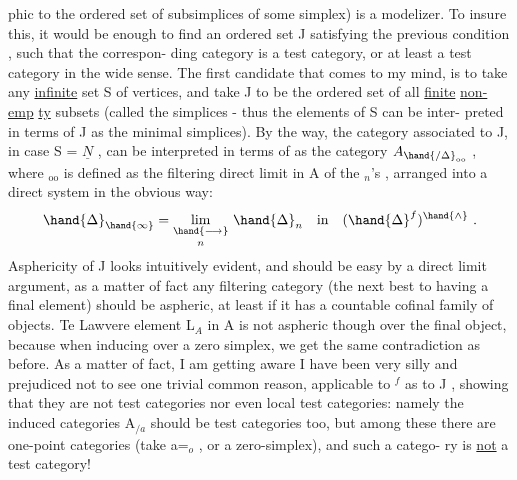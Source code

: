 
phic to the ordered set of subsimplices of some simplex) is a modelizer.
To insure this,  it would be enough to find an ordered set J satisfying the
previous condition  , such that the correspon-%
ding category is a test category,  or at least a test category in the wide
sense.  The first candidate that comes to my mind,  is to take any \uline{infinite}
set S of vertices,  and take J to be the ordered set of all \uline{finite} \uline{non-emp}%
\uline{ty} subsets (called the simplices  -  thus the elements of S can be inter-%
preted in terms of J as the minimal simplices).  By the way,  the category
associated to J,  in case S = $\underline{N}$ ,  can be interpreted in terms of  as
the category  $A_{\hand{/\Delta}_{\mathrm{oo}}}$ ,  where \hand{\ensuremath{\Delta}}$_{\mathrm{oo}}$ is defined as the filtering direct limit
 in A\hand{\ensuremath{^{\wedge}}} of the \hand{\ensuremath{\Delta}}$_n$'s ,  arranged into a direct system in the obvious way:
%
\[ \hand{\ensuremath{\Delta}}_{\hand{\infty}} = \underset{n}{\underset{\hand{\ensuremath{\longrightarrow}}}{\mathrm{lim}}}\ \hand{\ensuremath{\Delta}}_n \quad \text{in} \quad (\hand{\ensuremath{\Delta}}^f)^{\hand{\wedge}}\ . \]
Asphericity of J looks intuitively evident,  and should be easy by a direct
limit argument,  as a matter of fact any filtering  category (the next
best to having a final element) should be aspheric,  at least if it has a
countable cofinal family of objects.  Te Lawvere element  L$_A$ in A\hand{\ensuremath{^{\wedge}}} is not
aspheric though over the final object,  because when inducing over a zero
simplex,  we get the same contradiction as before.  As a matter of fact,
I am getting aware I have been very silly and prejudiced not to see one
trivial common reason,  applicable to \hand{\ensuremath{\Delta}}$^f$ as to J , showing that they are
not test categories nor even local test categories:  namely the induced
categories A$_{/a}$ should be test categories too,  but among these there are
one-point categories (take a=\hand{\ensuremath{\Delta}}$_o$ ,  or a zero-simplex),  and such a catego-%
ry is \uline{not} a test category!

